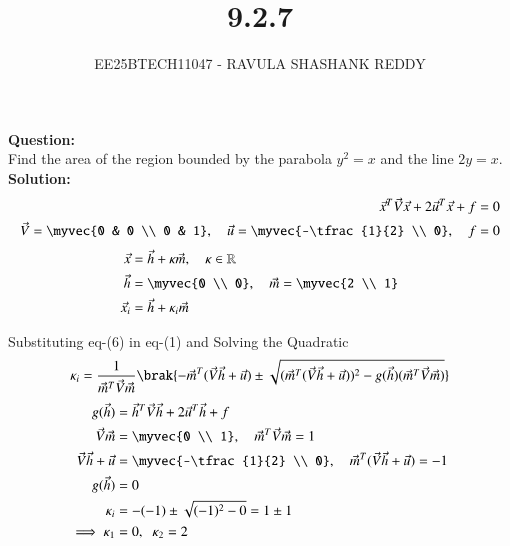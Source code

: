 \documentclass[journal]{article}
\begin{document}
	
	
	\vspace{3cm}
	
\title{9.2.7}
\author{EE25BTECH11047 - RAVULA SHASHANK REDDY}
\maketitle
\hrulefill
\bigskip 

\renewcommand{\thetable}{\theenumi}
\setlength{\intextsep}{10pt}

\textbf{Question:} \\

Find the area of the region bounded by the parabola $y^2 = x$ and the line $2y = x$.\\

\textbf{Solution:}
\begin{align}
\vec{x}^T \vec{V} \vec{x} + 2\vec{u}^T\vec{x} + f = 0 \\
\vec{V} = \myvec{0 & 0 \\ 0 & 1},\quad 
\vec{u} = \myvec{-\tfrac{1}{2} \\ 0},\quad f=0 \\
\end{align}
\begin{align}
\vec{x} &= \vec{h} + \kappa \vec{m}, \quad \kappa \in \mathbb{R} \\
\vec{h} &= \myvec{0 \\ 0}, \quad 
\vec{m} = \myvec{2 \\ 1} \\
\vec{x}_i &= \vec{h} + \kappa_i \vec{m} 
\end{align}

Substituting eq-(6) in eq-(1) and Solving the Quadratic 
\begin{align}
\kappa_i = \frac{1}{\vec{m}^T \vec{V} \vec{m}}
\brak{-\vec{m}^T(\vec{V}\vec{h}+\vec{u})
\pm \sqrt{(\vec{m}^T(\vec{V}\vec{h}+\vec{u}))^2 - g(\vec{h})(\vec{m}^T \vec{V} \vec{m})}} 
\end{align}
\begin{align}
g(\vec{h}) &= \vec{h}^T \vec{V} \vec{h} + 2\vec{u}^T \vec{h} + f\\
\vec{V}\vec{m} &= \myvec{0 \\ 1},\quad 
\vec{m}^T \vec{V} \vec{m} = 1 \\
\vec{V}\vec{h}+\vec{u} &= \myvec{-\tfrac{1}{2} \\ 0},\quad
\vec{m}^T(\vec{V}\vec{h}+\vec{u}) = -1 \\
g(\vec{h}) &= 0\\
\kappa_i &= -(-1) \pm \sqrt{(-1)^2 - 0} 
= 1 \pm 1 \\
\implies \kappa_1 &= 0,\;\; \kappa_2 = 2
\end{align}
\end{document}
